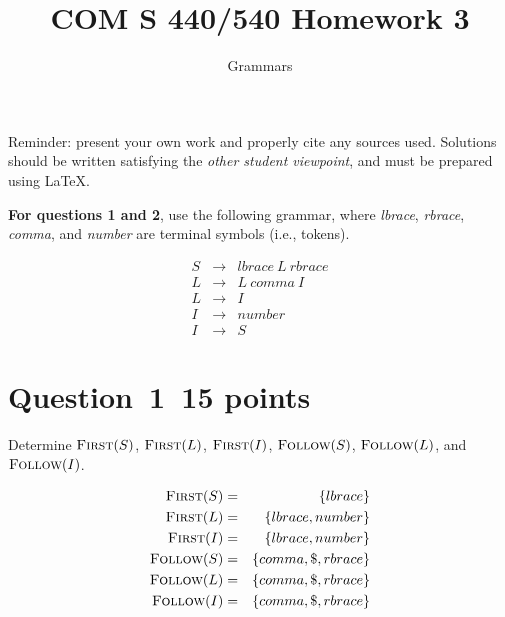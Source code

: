 \documentclass[10pt]{article}
\title{COM S 440/540 Homework 3}
\date{}
\author{Grammars}
\begin{document}
\maketitle

\noindent
Reminder: present your own work and properly cite any sources used.
Solutions should be written satisfying the \emph{other student viewpoint},
and must be prepared using \LaTeX.
\renewcommand{\thepage}{~}
 
\noindent 
{\bf For questions 1 and 2}, use the following grammar, where
\emph{lbrace}, \emph{rbrace}, \emph{comma}, and \emph{number}
are terminal symbols (i.e., tokens).

\begin{eqnarray}
  S & \rightarrow & \mathit{lbrace} ~L~ \mathit{rbrace}
\\
  L & \rightarrow & L ~\mathit{comma}~ I
\\
  L & \rightarrow & I
\\
  I & \rightarrow & \mathit{number}
\\
  I & \rightarrow & S
\end{eqnarray}


\section*{Question~1~\hfill 15 points}

Determine
  $\textsc{First}(S)$,
  $\textsc{First}(L)$,
  $\textsc{First}(I)$,
  $\textsc{Follow}(S)$,
  $\textsc{Follow}(L)$, and
  $\textsc{Follow}(I)$.
\begin{framed}
\begin{eqnarray*}
    \textsc{First}(S) & = & \{lbrace\} \\
    \textsc{First}(L) & = & \{lbrace, number \} \\
    \textsc{First}(I) & = & \{lbrace, number \} \\
    \textsc{Follow}(S) & = & \{comma, \$, rbrace\} \\
    \textsc{Follow}(L) & = & \{comma, \$, rbrace\} \\
    \textsc{Follow}(I) & = & \{comma, \$, rbrace\}
\end{eqnarray*}
\end{framed}
\end{document}
